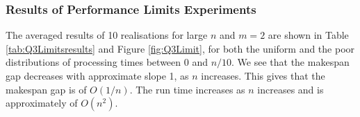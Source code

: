 \documentclass[12pt,a4paper,reqno]{article}
\begin{document}

\subsubsection{Results of Performance Limits Experiments}
The averaged results of 10 realisations for large $n$ and $m=2$ are shown in Table \ref{tab:Q3Limitsresults} and Figure \ref{fig:Q3Limit}, for both the uniform and the poor distributions of processing times between 0 and $n/10$. We see that the makespan gap decreases with approximate slope 1, as $n$ increases. This gives that the makespan gap is of $O(1/n)$. The run time increases as $n$ increases and is approximately of $O(n^2)$. \\
\end{document}
